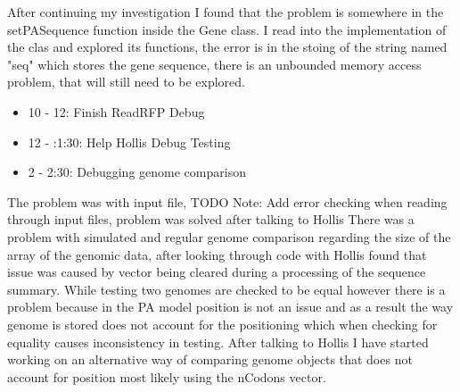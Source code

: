 \documentclass[12pt,hyperref]{labbook}
\begin{document}
After continuing my investigation I found that the problem is somewhere in the setPASequence function inside the Gene class. I read into the implementation of the clas and explored its functions, the error is in the stoing of the string named "seq" which stores the gene sequence, there is an unbounded memory access problem, that will still need to be explored. 
\begin{itemize}
    \item 10 - 12: Finish ReadRFP Debug
    \item 12 - :1:30: Help Hollis Debug Testing
    \item 2 - 2:30: Debugging genome comparison
\end{itemize}
The problem was with input file, TODO Note: Add error checking when reading through input files, problem was solved after talking to Hollis
There was a problem with simulated and regular genome comparison regarding the size of the array of the genomic data, after looking through code with Hollis found that issue was caused by vector being cleared during a processing of the sequence summary.
While testing two genomes are checked to be equal however there is a problem because in the PA model position is not an issue and as a result the way genome is stored does not account for the positioning which when checking for equality causes inconsistency in testing. After talking to Hollis I have started working on an alternative way of comparing genome objects that does not account for position most likely using the nCodons vector. 
\end{document}
